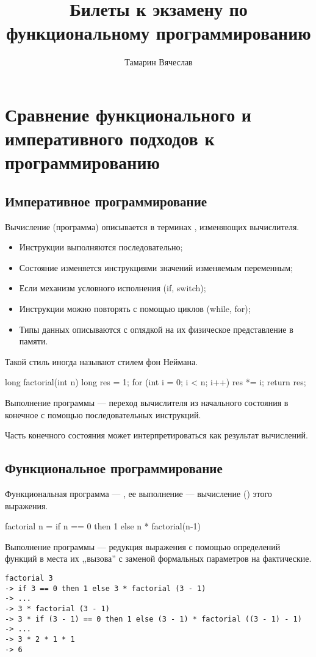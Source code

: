 \documentclass[11pt,a4paper]{article}
\title{Билеты к экзамену по функциональному программированию}
\author{Тамарин Вячеслав}
\begin{document}
\maketitle


\section{Сравнение функционального и императивного подходов к программированию}
\subsection{Императивное программирование}
Вычисление (программа) описывается в терминах , изменяющих  вычислителя.
\begin{itemize}
	\item Инструкции выполняются последовательно;
	\item Состояние изменяется инструкциями  значений изменяемым переменным;
	\item Если механизм условного исполнения (if, switch);
	\item Инструкции можно повторять с помощью циклов (while, for);
	\item Типы данных описываются с оглядкой на их физическое представление в памяти.
\end{itemize}
Такой стиль иногда называют стилем фон Неймана.
\begin{ccode}
long factorial(int n) {
	long res = 1;
	for (int i = 0; i < n; i++) 
		res *= i;
	return res;
}
\end{ccode}
Выполнение программы --- переход вычислителя из начального состояния в конечное с помощью последовательных инструкций.

Часть конечного состояния может интерпретироваться как результат вычислений.

\subsection{Функциональное программирование}
	Функциональная программа --- , ее выполнение --- вычисление () этого выражения.
\begin{hscode}
factorial n = if n == 0 then 1 else n * factorial(n-1)
\end{hscode}
Выполнение программы --- редукция выражения с помощью  определений функций в места их ,,вызова'' с заменой формальных параметров на фактические.
\begin{verbatim}
factorial 3
-> if 3 == 0 then 1 else 3 * factorial (3 - 1)
-> ...
-> 3 * factorial (3 - 1)
-> 3 * if (3 - 1) == 0 then 1 else (3 - 1) * factorial ((3 - 1) - 1)
-> ...
-> 3 * 2 * 1 * 1 
-> 6
\end{verbatim}
\end{document}
